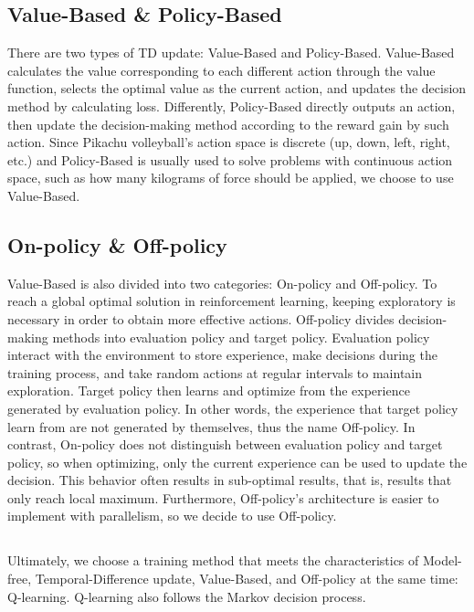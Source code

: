 \documentclass[sigconf]{acmart}
\begin{document}
\subsection{Value-Based \& Policy-Based}
There are two types of TD update: Value-Based and Policy-Based. Value-Based calculates the value corresponding to each different action through the value function, selects the optimal value as the current action, and updates the decision method by calculating loss. Differently, Policy-Based directly outputs an action, then update the decision-making method according to the reward gain by such action. Since Pikachu volleyball’s action space is discrete (up, down, left, right, etc.) and Policy-Based is usually used to solve problems with continuous action space, such as how many kilograms of force should be applied, we choose to use Value-Based.

\subsection{On-policy \& Off-policy}
Value-Based is also divided into two categories: On-policy and Off-policy. To reach a global optimal solution in reinforcement learning, keeping exploratory is necessary in order to obtain more effective actions. Off-policy divides decision-making methods into evaluation policy and target policy. Evaluation policy interact with the environment to store experience, make decisions during the training process, and take random actions at regular intervals to maintain exploration. Target policy then learns and optimize from the experience generated by evaluation policy. In other words, the experience that target policy learn from are not generated by themselves, thus the name Off-policy. In contrast, On-policy does not distinguish between evaluation policy and target policy, so when optimizing, only the current experience can be used to update the decision. This behavior often results in sub-optimal results, that is, results that only reach local maximum. Furthermore, Off-policy’s architecture is easier to implement with parallelism, so we decide to use Off-policy.

\subsection*{}
Ultimately, we choose a training method that meets the characteristics of Model-free, Temporal-Difference update, Value-Based, and Off-policy at the same time: Q-learning. Q-learning also follows the Markov decision process.
\end{document}
